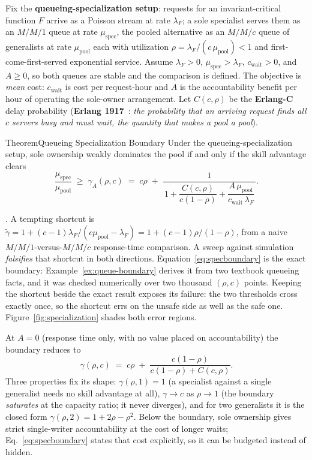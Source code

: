 \documentclass[11pt,a4paper]{article}
\theoremstyle{definition}
\theoremstyle{plain}
\begin{document}
Fix the \textbf{queueing-specialization setup}: requests for an invariant-critical
function $F$ arrive as a Poisson stream at rate $\lambda_F$; a sole specialist
serves them as an $M/M/1$ queue at rate $\mu_{\mathrm{spec}}$, the pooled
alternative as an $M/M/c$ queue of generalists at rate $\mu_{\mathrm{pool}}$ each
with utilization $\rho=\lambda_F/(c\,\mu_{\mathrm{pool}})<1$ and
first-come-first-served exponential service. Assume $\lambda_F>0$,
$\mu_{\mathrm{spec}}>\lambda_F$, $c_{\mathrm{wait}}>0$, and $A\ge0$, so both queues are
stable and the comparison is defined. The objective is \emph{mean} cost: $c_{\mathrm{wait}}$
is cost per request-hour and $A$ is the accountability benefit per hour of
operating the sole-owner arrangement. Let
$C(c,\rho)$ be the \textbf{Erlang-C} delay probability (\textbf{Erlang
1917}~: \emph{the probability that an arriving request finds
all $c$ servers busy and must wait, the quantity that makes a pool a pool}).

\begin{pdclaim}{Theorem}{Queueing Specialization Boundary}
\setlength{\parskip}{4pt plus 1pt}
\label{thm:specialization}
Under the queueing-specialization setup, sole ownership weakly dominates the pool
if and only if the skill advantage clears
\begin{equation}\label{eq:specboundary}
\frac{\mu_{\mathrm{spec}}}{\mu_{\mathrm{pool}}} \;\ge\; \gamma_A(\rho,c)
\;=\; c\rho \;+\; \frac{1}{\,1 + \dfrac{C(c,\rho)}{c(1-\rho)}
      + \dfrac{A\,\mu_{\mathrm{pool}}}{c_{\mathrm{wait}}\,\lambda_F}\,}.
\end{equation}
\end{pdclaim}

\noindent\Verified. A tempting shortcut is
$\tilde\gamma = 1+(c-1)\lambda_F/(c\mu_{\mathrm{pool}}-\lambda_F)
= 1+(c-1)\rho/(1-\rho)$, from a naive
$M/M/1$-versus-$M/M/c$ response-time comparison. A sweep against simulation
\emph{falsifies} that shortcut in both directions. Equation~\ref{eq:specboundary}
is the exact boundary: Example~\ref{ex:queue-boundary} derives it from two
textbook queueing facts, and it was checked numerically over two
thousand $(\rho,c)$ points. Keeping the shortcut beside the exact result exposes
its failure: the two thresholds cross exactly once, so the shortcut errs on the
unsafe side as well as the safe one. Figure~\ref{fig:specialization} shades both error regions.

At $A=0$ (response time only, with no value placed on accountability) the boundary
reduces to
\begin{equation}\label{eq:specboundary0}
\gamma(\rho,c) \;=\; c\rho \;+\; \frac{c(1-\rho)}{c(1-\rho)+C(c,\rho)}.
\end{equation}
Three properties fix its shape: $\gamma(\rho,1)=1$ (a specialist against a single
generalist needs no skill advantage at all), $\gamma\to c$ as $\rho\to1$ (the boundary
\emph{saturates} at the capacity ratio; it never diverges), and for two generalists
it is the closed form $\gamma(\rho,2)=1+2\rho-\rho^2$. Below the boundary, sole
ownership gives strict single-writer accountability at the cost of longer waits;
Eq.~\ref{eq:specboundary} states that cost explicitly, so it can be budgeted
instead of hidden.
\end{document}

